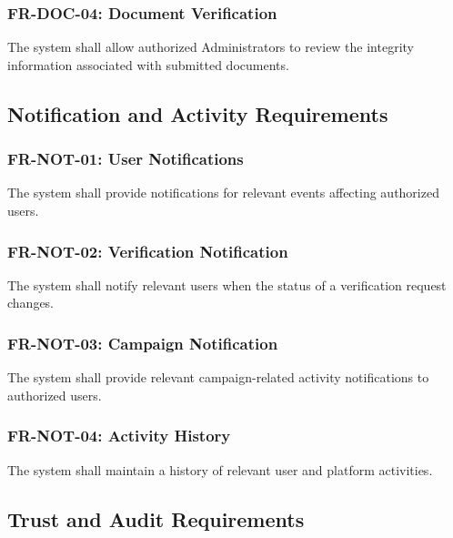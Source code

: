 \subsubsection{FR-DOC-04: Document Verification}

The system shall allow authorized Administrators to review the integrity
information associated with submitted documents.



\subsection{Notification and Activity Requirements}

\subsubsection{FR-NOT-01: User Notifications}

The system shall provide notifications for relevant events affecting
authorized users.

\subsubsection{FR-NOT-02: Verification Notification}

The system shall notify relevant users when the status of a verification
request changes.

\subsubsection{FR-NOT-03: Campaign Notification}

The system shall provide relevant campaign-related activity notifications
to authorized users.

\subsubsection{FR-NOT-04: Activity History}

The system shall maintain a history of relevant user and platform
activities.



\subsection{Trust and Audit Requirements}

